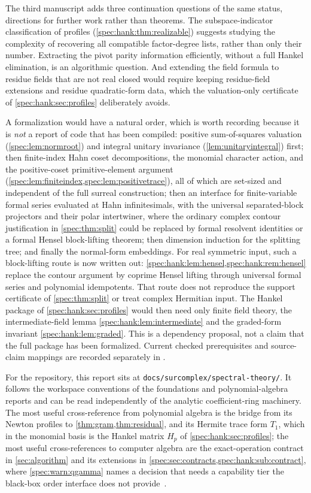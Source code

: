 \documentclass[11pt,a4paper]{article}
\numberwithin{equation}{section}
\theoremstyle{definition}
\theoremstyle{remark}
\begin{document}
The third manuscript adds three continuation questions of the same status,
directions for further work rather than theorems. The subspace-indicator
classification of profiles (\cref{spec:hank:thm:realizable}) suggests
studying the complexity of recovering all compatible factor-degree lists,
rather than only their number. Extracting the pivot parity information
efficiently, without a full Hankel elimination, is an algorithmic question.
And extending the field formula to residue fields that are not real closed
would require keeping residue-field extensions and residue quadratic-form
data, which the valuation-only certificate of \cref{spec:hank:sec:profiles}
deliberately avoids.

A formalization would have a natural order, which is worth recording
because it is \emph{not} a report of code that has been compiled: positive
sum-of-squares valuation (\cref{spec:lem:normroot}) and integral unitary
invariance (\cref{lem:unitaryintegral}) first; then finite-index Hahn coset
decompositions, the monomial character action, and the positive-coset
primitive-element argument (\cref{spec:lem:finiteindex,spec:lem:positivetrace}),
all of which are set-sized and independent of the full surreal construction;
then an interface for finite-variable formal series evaluated at Hahn
infinitesimals, with the universal separated-block projectors and their
polar intertwiner, where the ordinary complex contour justification in
\cref{spec:thm:split} could be replaced by formal resolvent identities or a
formal Hensel block-lifting theorem; then dimension induction for the
splitting tree; and finally the normal-form embeddings. For real symmetric
input, such a block-lifting route is now written out:
\cref{spec:hank:lem:hensel,spec:hank:rem:hensel} replace the contour argument
by coprime Hensel lifting through universal formal series and polynomial
idempotents. That route does not reproduce the support certificate of
\cref{spec:thm:split} or treat complex Hermitian input. The Hankel package of
\cref{spec:hank:sec:profiles} would then need only finite field theory, the
intermediate-field lemma \cref{spec:hank:lem:intermediate} and the graded-form
invariant \cref{spec:hank:lem:graded}. This is a dependency
proposal, not a claim that the full package has been formalized. Current
checked prerequisites and source-claim mappings are recorded separately in
.

For the repository, this report sits at
\texttt{docs/surcomplex/spectral-theory/}. It follows the workspace
conventions of the foundations and polynomial-algebra reports and can be
read independently of the analytic coefficient-ring machinery. The most
useful cross-reference from polynomial algebra is the bridge from its Newton
profiles to \cref{thm:gram,thm:residual}, and its Hermite trace form $T_1$,
which in the monomial basis is the Hankel matrix $H_p$ of
\cref{spec:hank:sec:profiles}; the most useful cross-references
to computer algebra are the exact-operation contract in \cref{sec:algorithm}
and its extensions in \cref{spec:sec:contracts,spec:hank:sub:contract}, where
\cref{spec:warn:qgamma} names a decision that needs a capability tier the
black-box order interface does not provide~\cite{RepoCAS}.
\end{document}

